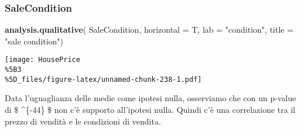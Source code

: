 \documentclass[
]{article}
\newenvironment{Shaded}{\begin{snugshade}}{\end{snugshade}}
\newcommand{\AttributeTok}[1]{\textcolor[rgb]{0.13,0.29,0.53}{#1}}
\newcommand{\FunctionTok}[1]{\textcolor[rgb]{0.13,0.29,0.53}{\textbf{#1}}}
\newcommand{\NormalTok}[1]{#1}
\newcommand{\StringTok}[1]{\textcolor[rgb]{0.31,0.60,0.02}{#1}}
\begin{document}
\subsubsection{SaleCondition}\label{salecondition-1}

\begin{Shaded}
\begin{Highlighting}[]
\FunctionTok{analysis.qualitative}\NormalTok{(}
\NormalTok{    SaleCondition,}
    \AttributeTok{horizontal =}\NormalTok{ T,}
    \AttributeTok{lab =} \StringTok{"condition"}\NormalTok{,}
    \AttributeTok{title =} \StringTok{"sale condition"}\NormalTok{)}
\end{Highlighting}
\end{Shaded}

\texttt{[image: HousePrice\\\%5B3\\\%5D\_files/figure-latex/unnamed-chunk-238-1.pdf]}

Data l'uguaglianza delle medie come ipotesi nulla, osserviamo che con un
p-value di \$ \^{}\{-44\} \$ non c'è supporto all'ipotesi
nulla. Quindi c'è una correlazione tra il prezzo di vendità e le
condizioni di vendita.
\end{document}
